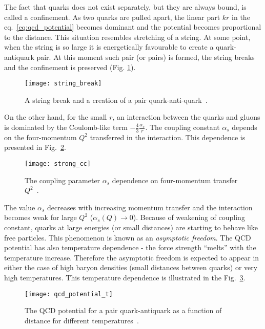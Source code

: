       The fact that quarks does not exist separately, but they are always bound, is called a confinement.
      As two quarks are pulled apart, the linear part $kr$ in the eq.~\ref{eq:qcd_potential} becomes dominant and the potential becomes proportional to the distance.
      This situation resembles stretching of a string.
      At some point, when the string is so large it is energetically favourable to create a quark-antiquark pair.
      At this moment such pair (or pairs) is formed, the string breaks and the confinement is preserved (Fig. \ref{fig:string_break}).
      \begin{figure}[h]
        \centering
        \texttt{[image: string\_break]}
        \caption{A string break and a creation of a pair quark-anti-quark~\cite{dfck}.}
        \label{fig:string_break}
      \end{figure}
      
      On the other hand, for the small $r$, an interaction between the quarks and gluons is dominated by the Coulomb-like term $-\frac{4}{3} \frac{\alpha_s}{r}$.
      The coupling constant $\alpha_s$ depends on the four-momentum $Q^2$ transferred in the interaction.
      This dependence is presented in Fig.~\ref{fig:strong_cc}.
      \begin{figure}[h]
        \centering
        \texttt{[image: strong\_cc]}
        \caption{The coupling parameter $\alpha_s$ dependence on four-momentum transfer~$Q^2$~\cite{pdg}.}
        \label{fig:strong_cc}
      \end{figure}
      The value $\alpha_s$ decreases with increasing momentum transfer and the interaction becomes weak for large $Q^2$ ($\alpha_s (Q) \to 0$).
      Because of weakening of coupling constant, quarks at large energies (or small distances) are starting to behave like free particles.
      This phenomenon is known as an \textit{asymptotic freedom}.      
      The QCD potential has also temperature dependence - the force strength ``melts'' with the temperature increase.
      Therefore the asymptotic freedom is expected to appear in either the case of high baryon densities (small distances between quarks) or very high temperatures.
      This temperature dependence is illustrated in the Fig.~\ref{fig:qcd_potential}.
      \begin{figure}[h]
        \centering
        \texttt{[image: qcd\_potential\_t]}
        \caption{The QCD potential for a pair quark-antiquark as a function of distance for different temperatures~\cite{dfck}.}
        \label{fig:qcd_potential}
      \end{figure}
      
